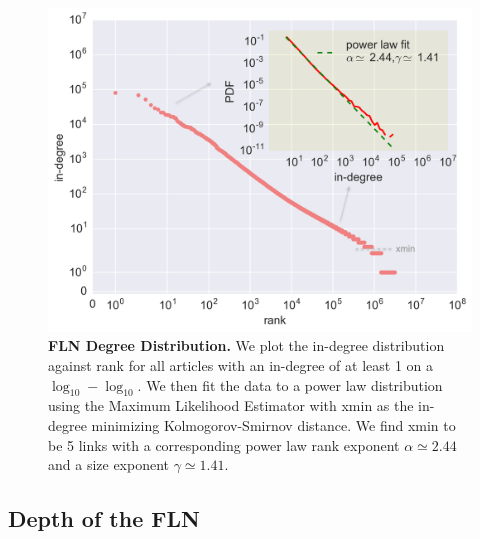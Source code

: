 \documentclass[pre,twocolumn,twoside,superscriptaddress,floatfix]{revtex4-1}
\begin{document}
{\begin{figure}[tp!]
  \includegraphics[width=\columnwidth]{fig006_ndegree_loglog.pdf}
  \caption{
    \textbf{FLN Degree Distribution.}
    We plot the in-degree distribution against rank for all articles with an in-degree of at least 1 on a $\log_{10}-\log_{10}$. We then fit the data to a power law 
    distribution using the Maximum Likelihood Estimator with xmin as the in-degree minimizing Kolmogorov-Smirnov distance. We find xmin to be 5 links with a corresponding power law rank exponent $\alpha \simeq 2.44$ and a size exponent $\gamma \simeq 1.41$.
}
  \label{fig:degree distribution}
\end{figure}

\subsection{Depth of the FLN}

}
\end{document}
